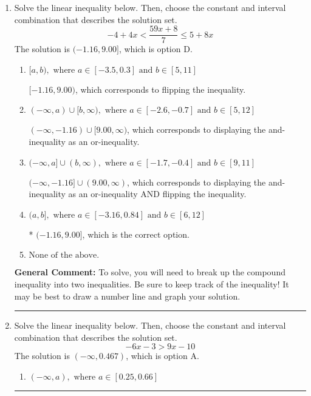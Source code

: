 \documentclass{extbook}[14pt]
\newcommand{\litem}[1]{\item #1

\rule{\textwidth}{0.4pt}}
\begin{document}
\begin{enumerate}
{\begin{enumerate}[label=\Alph*.]
 $(-\infty, 8.089)$, which corresponds to switching the direction of the interval AND negating the endpoint. You likely did this if you did not flip the inequality when dividing by a negative as well as not moving values over to a side properly.
\item \( (a, \infty), \text{ where } a \in [6.09, 11.09] \)

 $(8.089, \infty)$, which corresponds to negating the endpoint of the solution.
\item \( \text{None of the above}. \)

You may have chosen this if you thought the inequality did not match the ends of the intervals.
\end{enumerate}

\textbf{General Comment:} Remember that less/greater than or equal to includes the endpoint, while less/greater do not. Also, remember that you need to flip the inequality when you multiply or divide by a negative.
}
\litem{
Solve the linear inequality below. Then, choose the constant and interval combination that describes the solution set.
\[ -4 + 4 x < \frac{59 x + 8}{7} \leq 5 + 8 x \]The solution is \( (-1.16, 9.00] \), which is option D.\begin{enumerate}[label=\Alph*.]
\item \( [a, b), \text{ where } a \in [-3.5, 0.3] \text{ and } b \in [5, 11] \)

$[-1.16, 9.00)$, which corresponds to flipping the inequality.
\item \( (-\infty, a) \cup [b, \infty), \text{ where } a \in [-2.6, -0.7] \text{ and } b \in [5, 12] \)

$(-\infty, -1.16) \cup [9.00, \infty)$, which corresponds to displaying the and-inequality as an or-inequality.
\item \( (-\infty, a] \cup (b, \infty), \text{ where } a \in [-1.7, -0.4] \text{ and } b \in [9, 11] \)

$(-\infty, -1.16] \cup (9.00, \infty)$, which corresponds to displaying the and-inequality as an or-inequality AND flipping the inequality.
\item \( (a, b], \text{ where } a \in [-3.16, 0.84] \text{ and } b \in [6, 12] \)

* $(-1.16, 9.00]$, which is the correct option.
\item \( \text{None of the above.} \)


\end{enumerate}

\textbf{General Comment:} To solve, you will need to break up the compound inequality into two inequalities. Be sure to keep track of the inequality! It may be best to draw a number line and graph your solution.
}
\litem{
Solve the linear inequality below. Then, choose the constant and interval combination that describes the solution set.
\[ -6x -3 > 9x -10 \]The solution is \( (-\infty, 0.467) \), which is option A.\begin{enumerate}[label=\Alph*.]
\item \( (-\infty, a), \text{ where } a \in [0.25, 0.66] \)


\end{enumerate}}
\end{enumerate}
\end{document}
